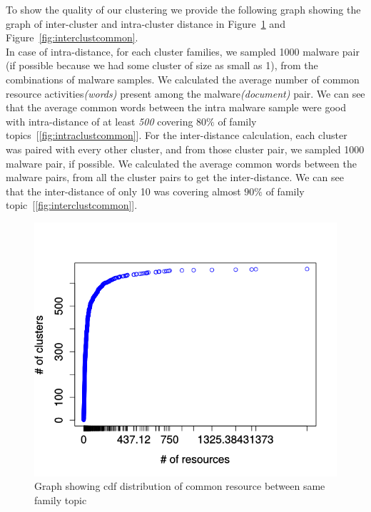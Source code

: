 To show the quality of our clustering we provide the following graph showing the graph of inter-cluster and intra-cluster distance in Figure~\ref{fig:intraclustcommon} and Figure~\ref{fig:interclustcommon}.\\
In case of intra-distance, for each cluster families, we sampled 1000 malware pair (if possible because we had some cluster of size as small as 1), from the combinations of malware samples.
We calculated the average number of common resource activities\textit{(words)} present among the malware\textit{(document)} pair.
We can see that the average common words between the intra malware sample were good with intra-distance of at least \emph{500} covering $80\%$ of family topics~[\autoref{fig:intraclustcommon}].
For the inter-distance calculation, each cluster was paired with every other cluster, and from those cluster pair, we sampled 1000 malware pair, if possible.
We calculated the average common words between the malware pairs, from all the cluster pairs to get the inter-distance.
We can see that the inter-distance of only 10 was covering almost $90\%$ of family topic~[\autoref{fig:interclustcommon}].
\begin{figure}[htbp]
\begin{center}
  \includegraphics[scale=0.7]{figures/intra_clustered_common.png}
\end{center}
\captionsetup{font=small}
\caption{ Graph showing cdf distribution of common resource between same family topic}
\label{fig:intraclustcommon}
\end{figure}
